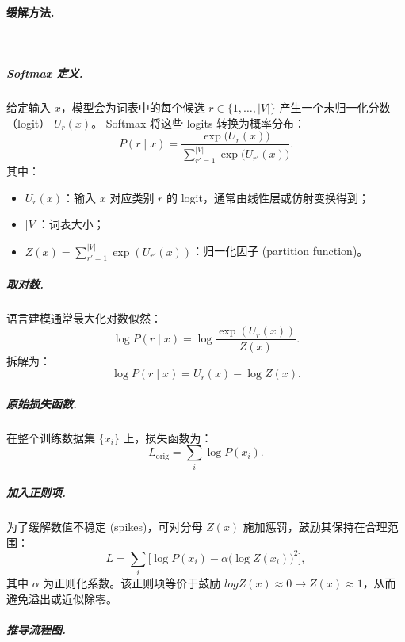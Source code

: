 \clearpage
\paragraph{缓解方法.}~{}

\subparagraph{Softmax 定义.}
给定输入 $x$，模型会为词表中的每个候选 $r \in \{1, \dots, |V|\}$ 产生一个未归一化分数（logit） $U_r(x)$。  
Softmax 将这些 logits 转换为概率分布：
\[
    P(r \mid x) = \frac{\exp\big(U_r(x)\big)}{\sum_{r'=1}^{|V|} \exp\big(U_{r'}(x)\big)}.
\]
其中：
\begin{itemize}
    \item $U_r(x)$：输入 $x$ 对应类别 $r$ 的 logit，通常由线性层或仿射变换得到；
    \item $|V|$：词表大小；
    \item $Z(x) = \sum_{r'=1}^{|V|} \exp(U_{r'}(x))$：归一化因子 (partition function)。
\end{itemize}

\subparagraph{取对数.}
语言建模通常最大化对数似然：
\[
    \log P(r \mid x) = \log \frac{\exp(U_r(x))}{Z(x)}.
\]
拆解为：
\[
    \log P(r \mid x) = U_r(x) - \log Z(x).
\]

\subparagraph{原始损失函数.}
在整个训练数据集 $\{x_i\}$ 上，损失函数为：
\[
    L_{\text{orig}} = \sum_i \log P(x_i).
\]

\subparagraph{加入正则项.}
为了缓解数值不稳定 (spikes)，可对分母 $Z(x)$ 施加惩罚，鼓励其保持在合理范围：
\[
    L = \sum_i \Big[ \log P(x_i) - \alpha \big(\log Z(x_i)\big)^2 \Big],
\]
其中 $\alpha$ 为正则化系数。该正则项等价于鼓励 $logZ(x) \approx 0 \rightarrow Z(x) \approx 1$，从而避免溢出或近似除零。

\subparagraph{推导流程图.}
\begin{center}
\end{center}

